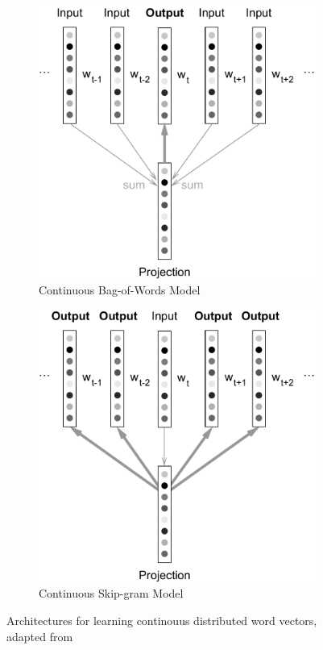 \begin{figure}[h]
    \centering
    \begin{subfigure}[b]{0.49\textwidth}
        \includegraphics[width=\textwidth]{img/cbow_vert2.pdf}
        \caption{Continuous Bag-of-Words Model}
        \label{fig:cbow}
    \end{subfigure}
    \begin{subfigure}[b]{0.49\textwidth}
        \includegraphics[width=\textwidth]{img/skip-gram_vert2.pdf}
        \caption{Continuous Skip-gram Model}
        \label{fig:skip-gram}
    \end{subfigure}
    \caption{Architectures for learning continouus distributed word vectors, adapted from \cite{Mikolov:2013ad}}
    \label{fig:cbow-skip-gram}
\end{figure}

